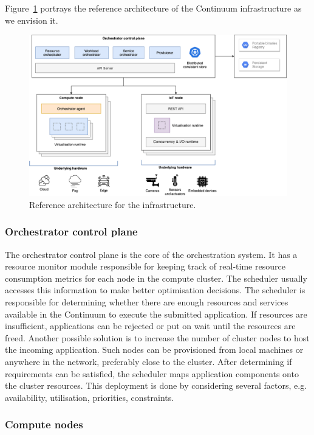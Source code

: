 Figure~\ref{fig:architecture-broad} portrays the reference architecture of the Continuum infrastructure as we envision it. 
\begin{figure}[ht]
\centering
\includegraphics[width=\columnwidth]{figures/architecture-broad}
\caption{Reference architecture for the infrastructure.}
\label{fig:architecture-broad}
\end{figure}

\subsubsection{Orchestrator control plane}

The orchestrator control plane is the core of the orchestration system. It has a resource monitor module responsible for keeping track of real-time resource consumption metrics for each node in the compute cluster. The scheduler usually accesses this information to make better optimisation decisions. The scheduler is responsible for determining whether there are enough resources and services available in the Continuum to execute the submitted application. If resources are insufficient, applications can be rejected or put on wait until the resources are freed. Another possible solution is to increase the number of cluster nodes to host the incoming application. Such nodes can be provisioned from local machines or anywhere in the network, preferably close to the cluster. After determining if requirements can be satisfied, the scheduler maps application components onto the cluster resources. This deployment is done by considering several factors, e.g. availability, utilisation, priorities, constraints.

\subsubsection{Compute nodes}

